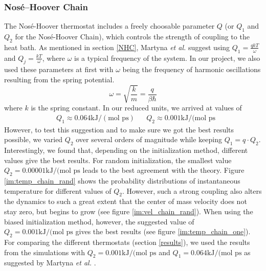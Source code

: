 \subsubsection{Nosé--Hoover Chain}
The Nosé-Hoover thermostat includes a freely choosable parameter $Q$ (or $Q_1$ and $Q_2$ for the Nosé-Hoover Chain), which controls the strength of coupling to the heat bath. As mentioned in section \ref{NHC}, Martyna \textit{et al.} \cite{Martyna1992} suggest using $Q_1 = \frac{qkT}{\omega}$ and $Q_j = \frac{kT}{\omega}$, where $\omega$ is a typical frequency of the system. In our project, we also used these parameters at first with $\omega$ being the frequency of harmonic oscillations resulting from the spring potential.
\begin{equation}
\omega = \sqrt{\frac{k}{m}} = \frac{q}{\beta \hbar}
\end{equation} 
where $k$ is the spring constant. In our reduced units, we arrived at values of 
\begin{align*}
& Q_1 \approx 0.064 \text{kJ}/(\text{mol ps}) && Q_2 \approx 0.001 \text{kJ}/(\text{mol ps}
\end{align*} 
However, to test this suggestion and to make sure we got the best results possible, we varied $Q_2$ over several orders of magnitude while keeping $Q_1 = q\cdot Q_2$. Interestingly, we found that, depending on the initialization method, different values give the best results. For random initialization, the smallest value $Q_2=0.00001 \text{kJ}/(\text{mol ps}$ leads to the best agreement with the theory. Figure \ref{im:temp_chain_rand} shows the probability distributions of instantaneous temperature for different values of $Q_2$. However, such a strong coupling also alters the dynamics to such a great extent that the center of mass velocity does not stay zero, but begins to grow (see figure \ref{im:vel_chain_rand}). 
When using the biased initialization method, however, the suggested value of $Q_2 = 0.001 \text{kJ}/(\text{mol ps}$ gives the best results (see figure \ref{im:temp_chain_one}). For comparing the different thermostats (section \ref{results}), we used the results from the simulations with $Q_2 = 0.001 \text{kJ}/(\text{mol ps}$ and $Q_1 = 0.064 \text{kJ}/(\text{mol ps}$ as suggested by Martyna \textit{et al.} \cite{Martyna1992}.

